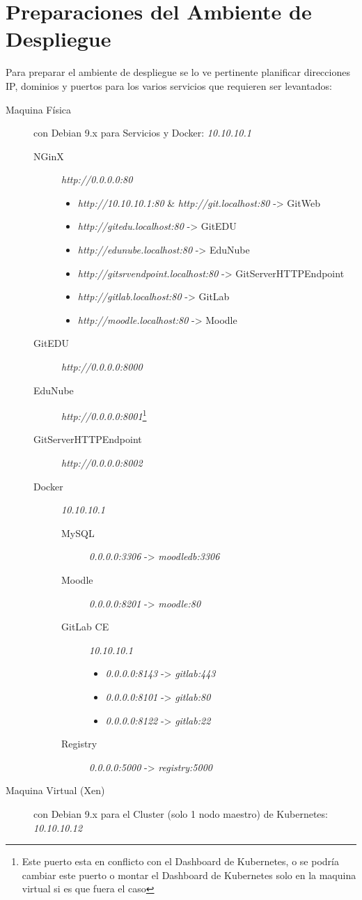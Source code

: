 \section{Preparaciones del Ambiente de Despliegue}
Para preparar el ambiente de despliegue se lo ve pertinente planificar direcciones IP, dominios y puertos para los varios servicios que requieren ser levantados:
\begin{description}
	\item[Maquina Física] con Debian 9.x para Servicios y Docker: \textit{10.10.10.1}
    \begin{description}
    	\item[NGinX] \textit{http://0.0.0.0:80}
        \begin{itemize}
            \item \textit{http://10.10.10.1:80} \& \textit{http://git.localhost:80} -> GitWeb
            \item \textit{http://gitedu.localhost:80} -> GitEDU
            \item \textit{http://edunube.localhost:80} -> EduNube
            \item \textit{http://gitsrvendpoint.localhost:80} -> GitServerHTTPEndpoint
            \item \textit{http://gitlab.localhost:80} -> GitLab
            \item \textit{http://moodle.localhost:80} -> Moodle
        \end{itemize}
        \item[GitEDU] \textit{http://0.0.0.0:8000}
        \item[EduNube] \textit{http://0.0.0.0:8001}\footnote{Este puerto esta en conflicto con el Dashboard de Kubernetes, o se podría cambiar este puerto o montar el Dashboard de Kubernetes solo en la maquina virtual si es que fuera el caso}
        \item[GitServerHTTPEndpoint] \textit{http://0.0.0.0:8002}
        \item[Docker] \textit{10.10.10.1}
        \begin{description}
        	\item[MySQL] \textit{0.0.0.0:3306} -> \textit{moodledb:3306}
        	\item[Moodle] \textit{0.0.0.0:8201} -> \textit{moodle:80}
        	\item[GitLab CE] \textit{10.10.10.1}
            \begin{itemize}
            	\item \textit{0.0.0.0:8143} -> \textit{gitlab:443}
            	\item \textit{0.0.0.0:8101} -> \textit{gitlab:80}
            	\item \textit{0.0.0.0:8122} -> \textit{gitlab:22}
            \end{itemize}
            \item[Registry] \textit{0.0.0.0:5000} -> \textit{registry:5000}
        \end{description}
    \end{description}
    \item[Maquina Virtual (Xen)] con Debian 9.x para el Cluster (solo 1 nodo maestro) de Kubernetes: \textit{10.10.10.12}
\end{description}

